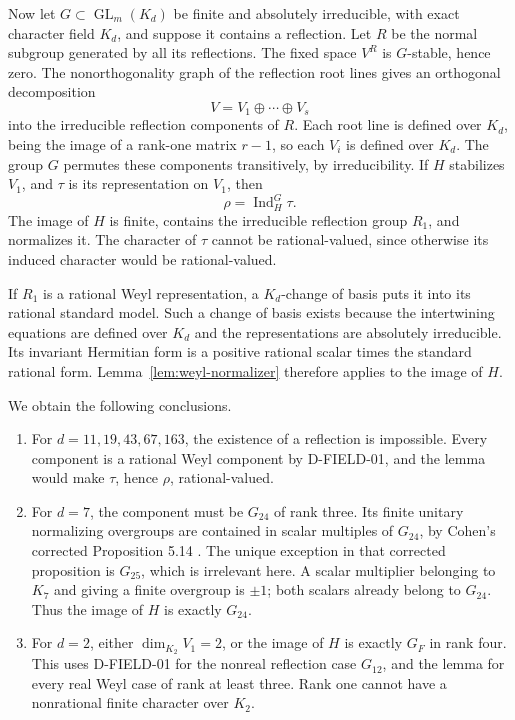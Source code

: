 Now let \(G\subset\operatorname{GL}_m(K_d)\) be finite and absolutely
irreducible, with exact character field \(K_d\), and suppose it contains
a reflection. Let \(R\) be the normal subgroup generated by all its
reflections. The fixed space \(V^R\) is \(G\)-stable, hence zero.
The nonorthogonality graph of the reflection root lines gives an
orthogonal decomposition
\[
                  V=V_1\oplus\cdots\oplus V_s
\]
into the irreducible reflection components of \(R\). Each root line
is defined over \(K_d\), being the image of a rank-one matrix
\(r-1\), so each \(V_i\) is defined over \(K_d\). The group \(G\)
permutes these components transitively, by irreducibility. If \(H\)
stabilizes \(V_1\), and \(\tau\) is its representation on \(V_1\),
then
\[
                         \rho=\operatorname{Ind}_H^G\tau.
\]
The image of \(H\) is finite, contains the irreducible reflection
group \(R_1\), and normalizes it. The character of \(\tau\) cannot
be rational-valued, since otherwise its induced character would be
rational-valued.

If \(R_1\) is a rational Weyl representation, a \(K_d\)-change of
basis puts it into its rational standard model. Such a change of basis
exists because the intertwining equations are defined over \(K_d\)
and the representations are absolutely irreducible. Its invariant
Hermitian form is a positive rational scalar times the standard rational
form. Lemma~\ref{lem:weyl-normalizer} therefore applies to the image of
\(H\).

We obtain the following conclusions.
\begin{enumerate}
\item For \(d=11,19,43,67,163\), the existence of a reflection
is impossible. Every component is a rational Weyl component by
D-FIELD-01, and the lemma would make \(\tau\), hence \(\rho\),
rational-valued.
\item For \(d=7\), the component must be \(G_{24}\) of rank three.
Its finite unitary normalizing overgroups are contained in scalar multiples of
\(G_{24}\), by Cohen's corrected Proposition 5.14
\cite[p.~435]{FIELD:Cohen}\cite[p.~613]{FIELD:CohenErr}.
The unique exception in that corrected proposition is \(G_{25}\),
which is irrelevant here. A scalar multiplier belonging to \(K_7\)
and giving a finite overgroup is \(\pm1\); both scalars already
belong to \(G_{24}\). Thus the image of \(H\) is exactly \(G_{24}\).
\item For \(d=2\), either \(\dim_{K_2}V_1=2\), or the image of
\(H\) is exactly \(G_F\) in rank four. This uses D-FIELD-01 for
the nonreal reflection case \(G_{12}\), and the lemma for every
real Weyl case of rank at least three. Rank one cannot have a
nonrational finite character over \(K_2\).
\end{enumerate}

